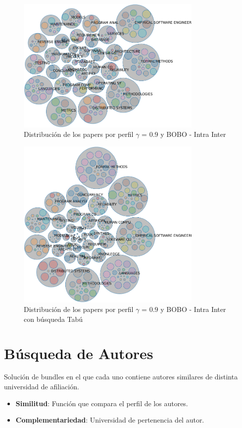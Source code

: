\begin{figure}[H]
  \centering
    \includegraphics[width=0.8\textwidth]{resultados/papers/BOBO/INTRA_INTER/bubbles-gamma-09.png}
  \caption{Distribución de los papers por perfil $\gamma$ = $0.9$ y BOBO - Intra Inter}
  \label{res:img-papers-bubbles-gamma09-bobo-intra-inter}
\end{figure}

\begin{figure}[H]
  \centering
    \includegraphics[width=0.8\textwidth]{resultados/papers/BOBO/INTRA_INTER/bubbles-gamma-with-local-09.png}
  \caption{Distribución de los papers por perfil $\gamma$ = $0.9$ y BOBO - Intra Inter con búsqueda Tabú}
  \label{res:img-papers-bubbles-gamma09-hac-intra-inter-bobo}
\end{figure}
\newpage
\section{Búsqueda de Autores}
Solución de bundles en el que cada uno contiene autores similares de distinta universidad de afiliación.\\
\begin{itemize}
  \item \textbf{Similitud}: Función que compara el perfil de los autores.
  \item \textbf{Complementariedad}: Universidad de pertenencia del autor.
\end{itemize}

